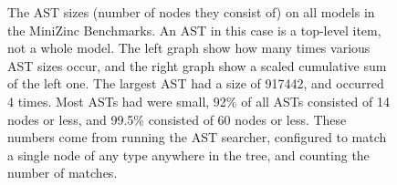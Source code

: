 \begin{figure}[ht]
  \centering
  \hfill%
  \caption{The AST sizes (number of nodes they consist of) on all models in the MiniZinc
    Benchmarks. An AST in this case is a top-level item, not a whole model. The left graph
    show how many times various AST sizes occur, and the right graph show a scaled
    cumulative sum of the left one. The largest AST had a size of 917442, and occurred 4
    times. Most ASTs had were small, 92\% of all ASTs consisted of 14 nodes or less, and
    99.5\% consisted of 60 nodes or less. These numbers come from running the AST
    searcher, configured to match a single node of any type anywhere in the tree, and
    counting the number of matches.}%
  \label{fig:ast:counts}
\end{figure}
